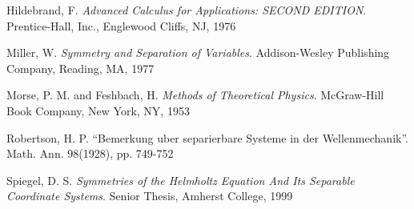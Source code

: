 \begin{thebibliography}{Hausner and Schwartz 1968}

 Hildebrand, F. \textsl{Advanced Calculus for Applications: \footnotesize{SECOND EDITION}}. Prentice-Hall, Inc., Englewood Cliffs, NJ, 1976

 Miller, W. \textsl{Symmetry and Separation of Variables}. Addison-Wesley Publishing Company, Reading, MA, 1977

 Morse, P. M. and Feshbach, H. \textsl{Methods of Theoretical Physics}. McGraw-Hill Book Company, New York, NY, 1953

 Robertson, H. P. ``Bemerkung uber separierbare Systeme in der Wellenmechanik''. Math. Ann. 98(1928), pp. 749-752

 Spiegel, D. S. \textsl{Symmetries of the Helmholtz Equation And Its Separable Coordinate Systems}. Senior Thesis, Amherst College, 1999

\end{thebibliography}